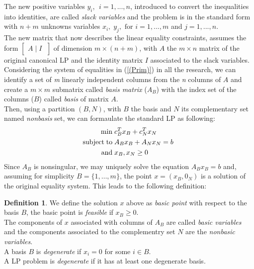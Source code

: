 \documentclass[a4paper,10 pt,titlepage,twoside]{book}
\theoremstyle{plain}
\theoremstyle{definition}
\newtheorem{defn}[thm]{Definition}
\theoremstyle{remark}
\begin{document}
The new positive variables $\mathit{y_{i}}$, $\;i=1, ..., n$, introduced to convert the inequalities into identities, are called \textit{slack variables} and the problem is in the standard form with $n+m$ unknowns variables $x_{i},\; y_{j}, \text{ for }i =1, ..., m$ and $j=1, ..., n$.\\ The new matrix that now describes the linear equality constraints, assumes the form $\left[\begin{matrix}A\;\vert\; I\;\end{matrix}\right]$ of dimension $m \times (n + m)$, with $A$ the $m \times n$ matrix of the original canonical LP and the identity matrix $I$ associated to the slack variables.\\
Considering the system of equalities in (\ref{(Prim)}) in all the research, we can identify a set of \textit{m} linearly independent columns from the \textit{n} columns of  $A$ and create a $m \times m$ submatrix called \textit{basis matrix} ($A_{B}$) with the index set of the columns ($B$) called \textit{basis} of matrix $A$.
\\ Then, using a partition $(B, N)$, with $B$ the basis and $N$ its complementary set named \textit{nonbasis} set, we can formaulate the standard LP as following:
\begin{equation}\label{(Prim1)}
\begin{split}
\min\;&c_{B}^{T}x_{B}+c_{N}^{T}x_{N}\\
\text{subject\;to\;}&A_{B}x_{B}+A_{N}x_{N}= b\;\\\text{and\;}&x_{B},x_{N}\geq0
\end{split}
\end{equation}
Since $A_{B}$ is nonsingular, we may uniquely solve the equation $A_{B}x_{B} = b$ and, assuming for simplicity $B = \{1, \dots, m\}$, the point $x =\left(x_{B},0_{N}\right)$ is a solution of the original equality system. This leads to the following definition:
\begin{defn}

	We define the solution $x$ above as \textit{basic point} with respect to the basis $B$, the basic point is \textit{feasible} if $x_{B}\geq 0$. \\The components of $x$ associated with columns of $A_{B}$ are called \textit{basic variables} and the components associated to the complementry set $N$ are the \textit{nonbasic variables}.\\
	A basis $B$ is \textit{degenerate} if $x_{i}= 0$ for some $i\in B$.\\
	A LP problem is \textit{degenerate} if it has at least one degenerate basis.
\end{defn}
\end{document}
